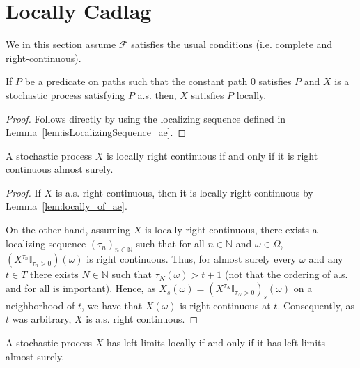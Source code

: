 \section{Locally Cadlag}

We in this section assume $\mathcal{F}$ satisfies the usual conditions (i.e. complete and right-continuous).

\begin{lemma}\label{lem:locally_of_ae}
  \leanok
  If $P$ be a predicate on paths such that the constant path $0$ satisfies $P$ and $X$ is a stochastic process satisfying $P$ a.s. then, $X$ satisfies $P$ locally.
\end{lemma}

\begin{proof}\leanok
  Follows directly by using the localizing sequence defined in Lemma~\ref{lem:isLocalizingSequence_ae}.
\end{proof}

\begin{lemma}\label{lem:locally_rightContinuous}
  \leanok
  A stochastic process $X$ is locally right continuous if and only if it is right continuous almost surely.
\end{lemma}

\begin{proof}
  \leanok
  If $X$ is a.s. right continuous, then it is locally right continuous by Lemma~\ref{lem:locally_of_ae}.

  On the other hand, assuming $X$ is locally right continuous, there exists a localizing sequence
  $(\tau_n)_{n \in \mathbb{N}}$ such that for all $n \in \mathbb{N}$ and $\omega \in \Omega$, $(X^{\tau_n}\mathbb{I}_{\tau_n > 0})(\omega)$ is right continuous.
  Thus, for almost surely every $\omega$ and any $t \in T$ there exists $N \in \mathbb{N}$ such that $\tau_N(\omega) > t + 1$ (not that the ordering of a.s. and for all is important). Hence, as
  $X_s(\omega) = (X^{\tau_N}\mathbb{I}_{\tau_N > 0})_s(\omega)$ on a neighborhood of $t$, we have that $X(\omega)$ is right continuous at $t$.
  Consequently, as $t$ was arbitrary, $X$ is a.s. right continuous.
\end{proof}

\begin{lemma}\label{lem:locally_leftLimit}
  \leanok
  A stochastic process $X$ has left limits locally if and only if it has left limits almost surely.
\end{lemma}

